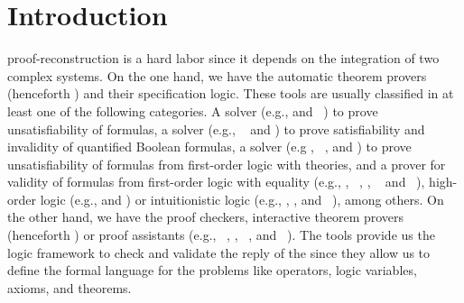 \documentclass[../main.tex]{subfiles}
\begin{document}

\section{Introduction}
\label{sec:introduction}

proof-reconstruction is a hard labor since it depends on the
integration of two complex systems. On the one hand, we have the
automatic theorem provers (henceforth \ATP) and their specification
logic. These tools are usually classified in at least one of the
following categories. A \SAT solver (e.g., 
\cite{Moskewicz2001} and ~\cite{Een2004}) to prove
unsatisfiability of \CNF formulas, a  solver (e.g.,
~\cite{Klieber2014} and 
\cite{Lonsing2017}) to prove satisfiability and invalidity of
quantified Boolean formulas, a \SMT solver (e.g 
\cite{Barrett2011}, ~\cite{bouton2009}, and 
\cite{DeMoura2008}) to prove unsatisfiability of formulas from
first-order logic with theories, and a prover for validity of
formulas from first-order logic with equality (e.g., 
\cite{Schulz:AICOM-2002}, ~\cite{Otten2008}, \Metis
\cite{hurd2003first},  ~\cite{Weidenbach2009} and
~\cite{Riazanov1999}), high-order logic (e.g.,
 \cite{Benzmuller2008} and 
\cite{Brown2012}) or intuitionistic logic (e.g., 
\cite{Otten2008},  \cite{Schmitt2001}, and
~\cite{Tammet1997}), among others. On the other hand,
we have the proof checkers, interactive theorem provers (henceforth
\ITP) or proof assistants (e.g., \Agda~\cite{agdateam}, 
\cite{coqteam}, ~\cite{paulson1994isabelle}, and
~\cite{norrish2007hol}). The \ITP tools provide us the
logic framework to check and validate the reply of the \ATPs since
they allow us to define the formal language for the problems like
operators, logic variables, axioms, and theorems.
\end{document}
